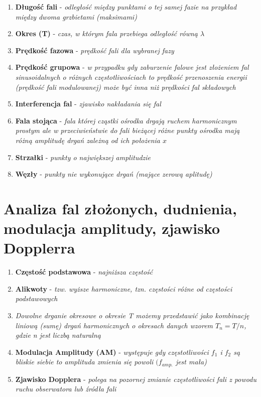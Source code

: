 \documentclass[12pt,twoside,a4paper]{book}
\begin{document}
\begin{enumerate}[label=(\alph*)]
\item\textbf{Długość fali} - \textit{odległość między punktami o tej samej fazie na przykład między dwoma grzbietami (maksimami)}
\item\textbf{Okres (T)} - \textit{czas, w którym fala przebiega odległość równą $\lambda$}
\item\textbf{Prędkość fazowa} - \textit{prędkość fali dla wybranej fazy}
\item\textbf{Prędkość grupowa} - \textit{w przypadku gdy zaburzenie falowe jest złożeniem fal sinusoidalnych o różnych
częstotliwościach to prędkość przenoszenia energii (prędkość fali modulowanej) może być
inna niż prędkości fal składowych}
\item\textbf{Interferencja fal} - \textit{zjawisko nakładania się fal}
\item\textbf{Fala stojąca} - \textit{fala której cząstki ośrodka drgają ruchem harmonicznym prostym ale w przeciwieństwie do fali bieżącej różne punkty ośrodka mają różną amplitudę drgań zależną od ich położenia $x$}
\item\textbf{Strzałki} - \textit{punkty o największej amplitudzie}
\item\textbf{Węzły} - \textit{punkty nie wykonujące drgań (mające zerową aplitudę)}
\end{enumerate}
\section{Analiza fal złożonych, dudnienia, modulacja amplitudy, zjawisko Dopplerra}
\begin{enumerate}[label=(\alph*)]
\item\textbf{Częstość podstawowa} - \textit{najniższa częstość}
\item\textbf{Alikwoty} - \textit{tzw. wyższe harmoniczne, tzn. częstości różne od częstości podstawowych}
\item\textit{Dowolne drganie okresowe o okresie T możemy przedstawić jako kombinację liniową (sumę) drgań harmonicznych o okresach danych wzorem $T_n = T/n$, gdzie n jest liczbą naturalną}
\item\textbf{Modulacja Amplitudy (AM)} - \textit{występuje gdy częstotliwości $f_1$ i $f_2$ są bliskie siebie to amplituda zmienia się powoli $(f_{amp.}$ jest mała)}
\item\textbf{Zjawisko Dopplera} - \textit{polega na pozornej zmianie częstotliwości fali z powodu ruchu
obserwatora lub źródła fali}
\end{enumerate}
\end{document}
